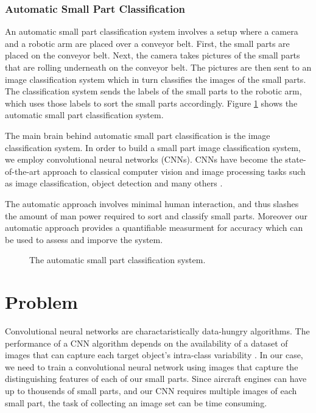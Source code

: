 \subsubsection{Automatic Small Part Classification}

An automatic small part classification system involves a setup where a camera and a robotic arm are placed over a conveyor belt. First, the small parts are placed on the conveyor belt. Next, the camera takes pictures of the small parts that are rolling underneath on the conveyor belt. The pictures are then sent to an image classification system which in turn classifies the images of the small parts. The classification system sends the labels of the small parts to the robotic arm, which uses those labels to sort the small parts accordingly. Figure \ref{fig:automatic_system} shows the automatic small part classification system.

The main brain behind automatic small part classification is the image classification system. In order to build a small part image classification system, we employ convolutional neural networks (CNNs). CNNs have become the state-of-the-art approach to classical computer vision and image processing tasks such as image classification, object detection and many others \cite{ILSVRC15}.

The automatic approach involves minimal human interaction, and thus slashes the amount of man power required to sort and classify small parts. Moreover our automatic approach provides a quantifiable measurment for accuracy which can be used to assess and imporve the system.

\begin{figure}[H]
\centering
{}
\caption{The automatic small part classification system.}
\label{fig:automatic_system}
\end{figure}


\section{Problem}

Convolutional neural networks are charactaristically data-hungry algorithms. The performance of a CNN algorithm depends on the availability of a dataset of images that can capture each target object's intra-class variability \cite{krizhevsky2012imagenet}. In our case, we need to train a convolutional neural network using images that capture the distinguishing features of each of our small parts. Since aircraft engines can have up to thousends of small parts, and our CNN requires multiple images of each small part, the task of collecting an image set can be time consuming.

